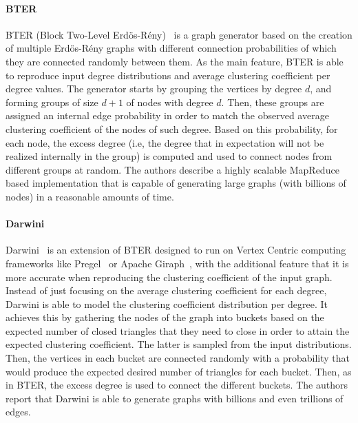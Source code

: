 \paragraph{BTER} BTER (Block Two-Level
Erd\"{o}s-R\'{e}ny)~\cite{kolda2014scalable} is a graph generator based on the
creation of multiple Erd\"{o}s-R\'{e}ny graphs with different connection
probabilities  of which they are connected randomly between them. As the main feature, BTER is able
to reproduce input degree distributions and average clustering
coefficient per degree values. The generator starts by grouping the vertices
by degree $d$, and forming groups of size $d+1$ of nodes with degree $d$. Then, these
groups are assigned an internal edge probability in order to match the observed
average clustering coefficient of the nodes of such degree. Based on this
probability, for each node, the excess degree (i.e, the degree that in
expectation will not be realized internally in the group) is computed and used to connect
nodes from different groups at random. The authors describe a highly scalable
MapReduce based implementation that is capable of generating large graphs (with
billions of nodes) in a reasonable amounts of time.

\paragraph{Darwini} Darwini~\cite{edunov2016darwini} is an extension of BTER
designed to run on Vertex Centric computing frameworks like
Pregel~\cite{malewicz2010pregel} or Apache Giraph~\cite{ching2015one}, with the
additional feature that it is more accurate when reproducing the clustering
coefficient of the input graph. Instead of just focusing on the average
clustering coefficient for each degree, Darwini is able to model the clustering
coefficient distribution per degree. It achieves this by gathering the nodes
of the graph into buckets based on the expected number of closed triangles that they need
to close in order to attain the expected clustering coefficient. The latter is
sampled from the input distributions. Then, the vertices in each bucket are
connected randomly with a probability that would produce the expected
desired number of triangles for each bucket. Then, as in BTER, the excess degree
is used to connect the different buckets. The authors report that Darwini is
able to generate graphs with billions and even trillions of edges.




